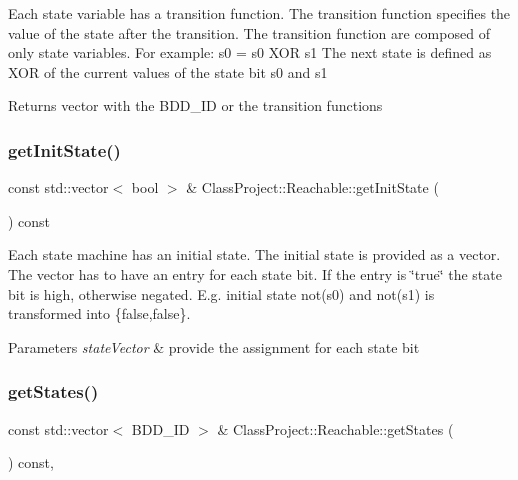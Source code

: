 Each state variable has a transition function. The transition function specifies the value of the state after the transition. The transition function are composed of only state variables. For example\+: s0\textquotesingle{} = s0 X\+OR s1 The next state is defined as X\+OR of the current values of the state bit s0 and s1 \begin{DoxyReturn}{Returns}
vector with the B\+D\+D\+\_\+\+ID or the transition functions 
\end{DoxyReturn}
\mbox{\label{classClassProject_1_1Reachable_a713e76e60c325f459c4561517fd832b6}} 
\subsubsection{\texorpdfstring{get\+Init\+State()}{getInitState()}}
{\footnotesize\ttfamily const std\+::vector$<$ bool $>$ \& Class\+Project\+::\+Reachable\+::get\+Init\+State (\begin{DoxyParamCaption}{ }\end{DoxyParamCaption}) const}

Each state machine has an initial state. The initial state is provided as a vector. The vector has to have an entry for each state bit. If the entry is \char`\"{}true\char`\"{} the state bit is high, otherwise negated. E.\+g. initial state not(s0) and not(s1) is transformed into \{false,false\}. 
\begin{DoxyParams}{Parameters}
{\em state\+Vector} & provide the assignment for each state bit \\
\hline
\end{DoxyParams}
\mbox{\label{classClassProject_1_1Reachable_a46b6aab8ea4dac374af4e2e97b5321dd}} 
\subsubsection{\texorpdfstring{get\+States()}{getStates()}}
{\footnotesize\ttfamily const std\+::vector$<$ B\+D\+D\+\_\+\+ID $>$ \& Class\+Project\+::\+Reachable\+::get\+States (\begin{DoxyParamCaption}{ }\end{DoxyParamCaption}) const\hspace{0.3cm}{\ttfamily [override]}, {\ttfamily [virtual]}}

